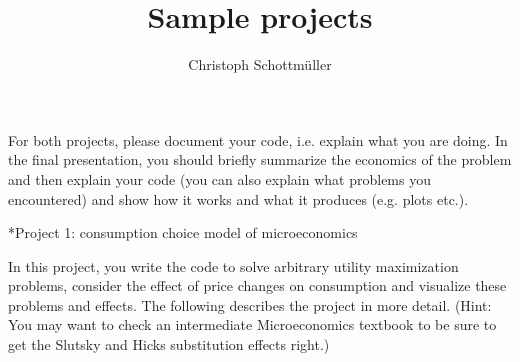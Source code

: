 \documentclass[a4paper,12pt]{article}
\makeatletter
\renewcommand{\section}{\@startsection{section}{1}{0mm}{-1.5\baselineskip}{0.8\baselineskip}{\normalfont\large\centering}}
\renewcommand{\section}{\@startsection{section}{1}{0mm}{-0.9\baselineskip}{0.5\baselineskip}{\normalfont\large\centering}}
\makeatother
\begin{document}
\title{Sample projects}
\author{Christoph Schottm\"uller}


\maketitle

For both projects, please document your code, i.e. explain what you are doing. In the final presentation, you should briefly summarize the economics of the problem and then explain your code (you can also explain what problems you encountered) and show how it works and what it produces (e.g. plots etc.). 

\section*{Project 1: consumption choice model of microeconomics}
\label{sec:proj-1:-cons}

In this project, you write the code to solve arbitrary utility maximization problems, consider the effect of price changes on consumption and  visualize these problems and effects. The following describes the project in more detail. (Hint: You may want to check an intermediate Microeconomics textbook to be sure to get the Slutsky and Hicks substitution effects right.)
\end{document}

